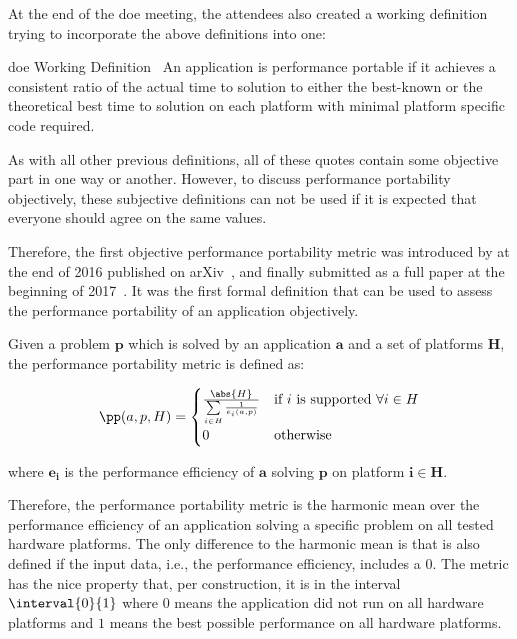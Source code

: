 At the end of the \gls{doe} meeting, the attendees also created a working definition trying to incorporate the above definitions into one: 
\begin{quotebox}{\gls{doe} Working Definition~\cite{doe_meeting_attendees_definition_nodate}}
    An application is performance portable if it achieves a consistent ratio of the actual time to solution to either the best-known or the theoretical best time to solution on each platform with minimal platform specific code required.
\end{quotebox} %

As with all other previous definitions, all of these quotes contain some objective part in one way or another.
However, to discuss performance portability objectively, these subjective definitions can not be used if it is expected that everyone should agree on the same values. 




Therefore, the first objective performance portability metric was introduced by \citeauthor{pennycook_implications_2019} at the end of 2016 published on arXiv~\cite{pennycook_metric_2016}, and finally submitted as a full paper at the beginning of 2017~\cite{pennycook_implications_2019}. 
It was the first formal definition that can be used to assess the performance portability of an application objectively.

\begin{definition}\label{def:pp}
    Given a problem $\mathbf{p}$ which is solved by an application $\mathbf{a}$ and a set of platforms $\mathbf{H}$, the performance portability metric \pp is defined as:

    \[ \pp(a, p, H) = 
        \begin{cases}
            \frac{\abs{H}}{\sum\limits_{i \in H} \frac{1}{e_i(a, p)}} & \text{if }i\text{ is supported } \forall i \in H \\
            0                                                         & \text{otherwise}
        \end{cases} 
    \]

    where $\mathbf{e_i}$ is the performance efficiency of $\mathbf{a}$ solving $\mathbf{p}$ on platform $\mathbf{i \in H}$.
\end{definition}

Therefore, the performance portability metric \pp is the harmonic mean over the performance efficiency of an application solving a specific problem on all tested hardware platforms. 
The only difference to the harmonic mean is that \pp is also defined if the input data, i.e., the performance efficiency, includes a $0$. 
The \pp metric has the nice property that, per construction, it is in the interval $\interval{0}{1}$ where $0$ means the application did not run on all hardware platforms and $1$ means the best possible performance on all hardware platforms. 

